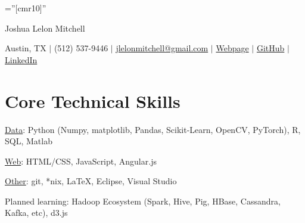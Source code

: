 \documentclass[a4paper,10pt]{article}
\begin{document}

\pagestyle{empty} %

\font\fb=''[cmr10]'' %

\par{\centering
		{\Huge Joshua Lelon Mitchell
	}\par}
\par{\centering
		{
	Austin, TX
	$\mid$
	(512) 537-9446
	$\mid$
	\href {mailto:jlelonmitchell@gmail.com}{jlelonmitchell@gmail.com}
	$\mid$
	\href {http://lelon.io/blog/2018/01/04/to-potential-employers}{Webpage}
	$\mid$
	\href {https://github.com/joshualmitchell}{GitHub}
	$\mid$
	\href {https://www.linkedin.com/in/joshua-mitchell-17b94077/}{LinkedIn}
}\par}

\section{Core Technical Skills}

\underline{Data}: Python (Numpy, matplotlib, Pandas, Scikit-Learn, OpenCV, PyTorch), R, SQL, Matlab

\underline{Web}: HTML/CSS, JavaScript, Angular.js

\underline{Other}: git, *nix, LaTeX, Eclipse, Visual Studio

Planned learning: Hadoop Ecosystem (Spark, Hive, Pig, HBase, Cassandra, Kafka, etc), d3.js

\end{document}
